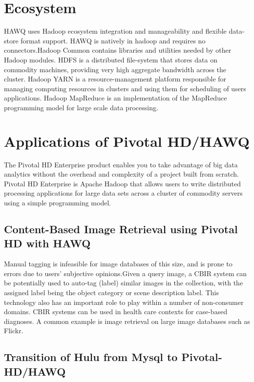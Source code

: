 \documentclass[9pt,twocolumn,twoside]{styles/osajnl}
\begin{document}
\section{Ecosystem}

HAWQ uses {Hadoop ecosystem}\cite{www-about-hadoop} integration and 
manageability and flexible data-store format support. HAWQ is 
natively in hadoop and requires no connectors.Hadoop Common contains 
libraries and utilities needed by other Hadoop modules. HDFS is a 
distributed file-system that stores data on commodity machines, 
providing very high aggregate bandwidth across the cluster. Hadoop 
YARN is a resource-management platform responsible for managing 
computing resources in clusters and using them for scheduling of 
users applications. Hadoop MapReduce is an implementation of the 
MapReduce programming model for large scale data processing.  

\section{Applications of Pivotal HD/HAWQ}

The Pivotal HD Enterprise product enables you to take advantage of 
big data analytics without the overhead and complexity of a project 
built from scratch. Pivotal HD Enterprise is Apache Hadoop that 
allows users to write distributed processing applications for large 
data sets across a cluster of commodity servers using a simple 
programming model. 

\subsection{Content-Based Image Retrieval using Pivotal HD with HAWQ}

Manual tagging is infeasible for image databases of this size, and is 
prone to errors due to users’ subjective opinions.Given a query 
image, a {CBIR}\cite{www-cbir} system can be potentially used to 
auto-tag (label) 
similar images in the collection, with the assigned label being the 
object category or scene description label. This technology also has 
an important role to play within a number of non-consumer domains. 
CBIR systems can be used in health care contexts for case-based 
diagnoses. A common example is {image retrieval on large image 
databases such as Flickr}\cite{www-paper-cbir}.

\subsection{Transition of Hulu from Mysql to Pivotal-HD/HAWQ}
\end{document}

